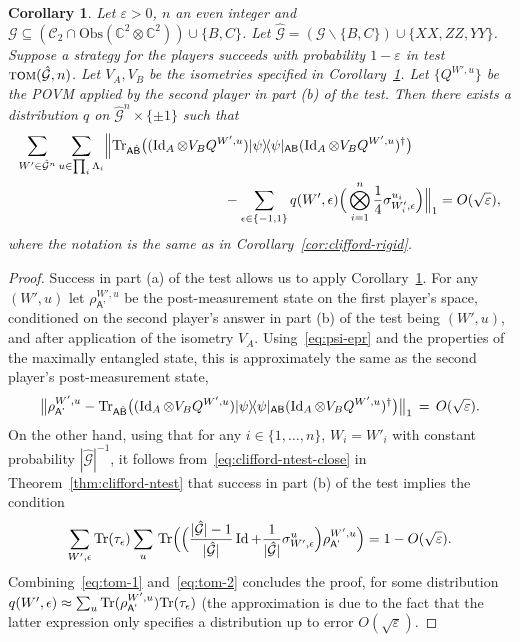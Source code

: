 \documentclass[11pt]{article}
\newtheorem{corollary}[theorem]{Corollary}
\theoremstyle{remark}
\theoremstyle{definition}
\newcommand{\ket}[1]{|#1\rangle}
\newcommand{\bra}[1]{\langle#1|}
\newcommand{\proj}[1]{\ket{#1}\!\bra{#1}}
\newcommand{\Tr}{\mbox{\rm Tr}}
\newcommand{\Id}{\ensuremath{\mathop{\rm Id}\nolimits}}
\newcommand{\reg}[1]{{\textsf{#1}}}
\newcommand{\C}{\ensuremath{\mathbb{C}}}
\newcommand{\setft}[1]{\mathrm{#1}}
\newcommand{\Obs}{\setft{Obs}}
\newcommand{\eps}{\varepsilon}
\newcommand{\tom}{\textsc{tom}}
\newcommand{\cliffordgb}{{\mathcal{C}_2}}
\begin{document}
\begin{corollary}\label{cor:clifford-rigid-adaptive}
Let $\eps>0$, $n$ an even integer and $\mathcal{G} \subseteq (\cliffordgb \cap \Obs(\C^2 \otimes \C^2))\cup\{B,C\}$. Let $\hat{\mathcal{G}} = (\mathcal{G}\backslash\{B,C\}) \cup \{XX,ZZ,YY\}$. Suppose a strategy for the players succeeds with probability $1-\eps$ in test $\tom(\hat{\mathcal{G}},n)$. Let $V_A,V_B$ be the isometries specified in Corollary~\ref{cor:clifford-rigid-adaptive}. Let $\{Q^{W',u}\}$ be the POVM applied by the second player in part (b) of the test. Then there exists a distribution $q$ on $\hat{\mathcal{G}}^n \times \{\pm 1\}$ such that 
\begin{align*}
 \sum_{W'\in\hat{\mathcal{G}}^n} \sum_{u\in\prod_i \Lambda_i} &\Big\| \Tr_{\reg{A}\hat{\reg{B}}} \big((\Id_A \otimes V_B Q^{W',u} )\proj{\psi}_{\reg{AB}} (\Id_A \otimes V_B Q^{W',u})^\dagger\big)\\
&\hskip3cm - \sum_{\epsilon\in\{-1,1\}}  q(W',\epsilon)  \Big( \bigotimes_{i=1}^n \frac{1}{4}\sigma_{W'_i,\epsilon}^{u_i}\Big) \Big\|_1 = O(\sqrt{\eps}),
\end{align*}
where the notation is the same as in Corollary~\ref{cor:clifford-rigid}. 
\end{corollary}

\begin{proof}
Success in part (a) of the test allows us to apply Corollary~\ref{cor:clifford-rigid-adaptive}. For any $(W',u)$ let $\rho_{\reg{A'}}^{W',u}$ be the post-measurement state on the first player's space, conditioned on the second player's answer  in part (b) of the test being $(W',u)$, and after application of the isometry $V_A$. Using~\eqref{eq:psi-epr} and the properties of the maximally entangled state,  this is approximately the same as the second player's post-measurement state, 
\begin{equation}\label{eq:tom-1}
\big\|\rho_{\reg{A'}}^{W',u} - \Tr_{\reg{A}\hat{\reg{B}}}\big((\Id_A\otimes V_B Q^{W',u} )\proj{\psi}_{\reg{AB}}(\Id_A\otimes V_B Q^{W',u} )^\dagger\big)\big\|_1 \,=\, O(\sqrt{\eps}).
\end{equation}
On the other hand, using that for any $i\in\{1,\ldots,n\}$, $W_i=W'_i$ with constant probability $|\hat{\mathcal{G}}|^{-1}$, 
it follows from~\eqref{eq:clifford-ntest-close} in Theorem~\ref{thm:clifford-ntest} that success in part (b) of the test implies the condition
\begin{equation}\label{eq:tom-2}
\sum_{W',\epsilon }\Tr(\tau_\epsilon) \sum_u\, \Tr\Big(\Big( \frac{|\hat{\mathcal{G}}|-1}{|\hat{\mathcal{G}}|}\Id + \frac{1}{|\hat{\mathcal{G}}|}\sigma_{W',\epsilon}^u \Big) \rho_{\reg{A'}}^{W',u}\Big)  = 1- O(\sqrt{\eps}). 
\end{equation}
Combining~\eqref{eq:tom-1} and~\eqref{eq:tom-2} concludes the proof, for some distribution $q(W',\epsilon) \approx \sum_u \Tr(\rho_{\reg{A'}}^{W',u})\Tr(\tau_\epsilon)$ (the approximation is due to the fact that the latter expression only specifies a distribution up to error $O(\sqrt{\eps})$. 
\end{proof}
\end{document}

